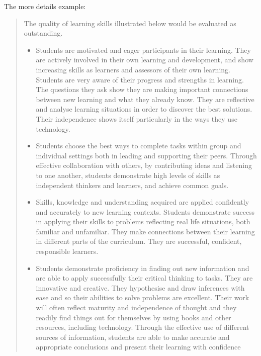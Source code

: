 The more details example:
\begin{quote}
The quality of learning skills illustrated below would be evaluated as outstanding.
\begin{itemize}
\item Students are motivated and eager participants in their learning. They are actively involved in their own learning and development, and show increasing skills as learners and assessors of their own learning. Students are very aware of their progress and strengths in learning. The questions they ask show they are making important connections between new learning and what they already know. They are reflective and analyse learning situations in order to discover the best solutions. Their independence shows itself particularly in the ways they use technology.
\item Students choose the best ways to complete tasks within group and individual settings both in leading and supporting their peers. Through effective collaboration with others, by contributing ideas and listening to one another, students demonstrate high levels of skills as independent thinkers and learners, and achieve common goals.
\item Skills, knowledge and understanding acquired are applied confidently and accurately to new learning contexts. Students demonstrate success in applying their skills to problems reflecting real life situations, both familiar and unfamiliar. They make connections between their learning in different parts of the curriculum. They are successful, confident, responsible learners.
\item Students demonstrate proficiency in finding out new information and are able to apply successfully their critical thinking to tasks. They are innovative and creative. They hypothesise and draw inferences with ease and so their abilities to solve problems are excellent. Their work will often reflect maturity and independence of thought and they readily find things out for themselves by using books and other resources, including technology. Through the effective use of different sources of information, students are able to make accurate and appropriate conclusions and present their learning with confidence
\end{itemize}
\end{quote}

